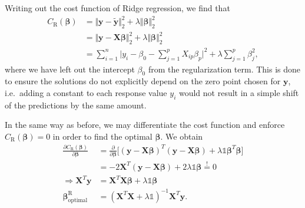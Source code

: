 \documentclass[a4paper]{article}
\begin{document}
\begin{multicols}{2}
Writing out the cost function of Ridge regression, we find that 
\begin{align}
C_\text{R}(\bm\beta) &= \Vert \mathbf{y}-\tilde{\mathbf{y}}\Vert_2^2 + \lambda \Vert \bm\beta \Vert_2^2 \nonumber \\
%
&= \Vert \mathbf{y} - \mathbf{X}\bm\beta\Vert_2^2 + \lambda \Vert \bm\beta \Vert_2^2 \nonumber \\ 
&= \sum_{i=1}^n \Big| y_i - \beta_0 - \sum_{j=1}^p X_{ip} \beta_p \Big|^2 + \lambda \sum_{j=1}^p \beta_j^2,
\end{align}
where we have left out the intercept $\beta_0$ from the regularization term. This is done to ensure the solutions do not explicitly depend on the zero point chosen for $\mathbf{y}$, i.e.\ adding a constant to each response value $y_i$ would not result in a simple shift of the predictions by the same amount\autocite{trevor2009elements}. 

In the same way as before, we may differentiate the cost function and enforce $C_\text{R}(\bm\beta)=0$ in order to find the optimal $\bm\beta$. We obtain
\begin{align}
\frac{\partial C_\text{R}(\bm\beta)}{\partial \bm\beta} &= \frac{\partial}{\partial \bm\beta} \Big[(\mathbf{y}-\mathbf{X}\bm\beta)^T (\mathbf{y}-\mathbf{X}\bm\beta) + \lambda \mathds{1} \bm\beta^T\bm\beta\Big] \nonumber \\
%
&= -2\mathbf{X}^T(\mathbf{y}-\mathbf{X}\bm\beta) +2\lambda\mathds{1}\bm\beta \stackrel{!}{=} 0 \nonumber \\
%
\Rightarrow \mathbf{X}^T\mathbf{y} &= \mathbf{X}^T\mathbf{X}\bm\beta +\lambda \mathds{1} \bm\beta \nonumber \\
%
\bm\beta^\text{R}_\text{optimal} &= \left(\mathbf{X}^T\mathbf{X}+\lambda\mathds{1}\right)^{-1}\mathbf{X}^T\mathbf{y}. \label{eq:ridgebeta}
\end{align}


\end{multicols}
\end{document}
